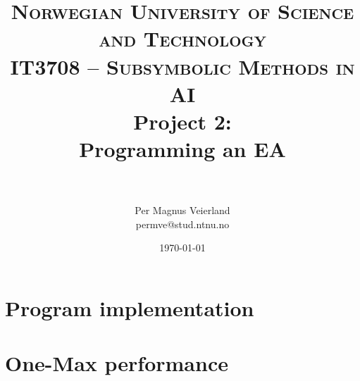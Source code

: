 

\usepackage{float}
\usepackage{tabularx}


\title{
\normalfont \normalsize
\textsc{Norwegian University of Science and Technology\\IT3708 -- Subsymbolic Methods in AI}
\horrule{0.5pt} \\[0.4cm]
\huge Project 2:\\ Programming an \acf{EA}\\
\horrule{2pt} \\[0.5cm]
}

\author{Per Magnus Veierland\\permve@stud.ntnu.no}

\date{\normalsize\today}

\pgfplotsset{compat=1.5}




\fancyfoot[C]{}
\maketitle



\section*{Program implementation}

\section*{One-Max performance}

